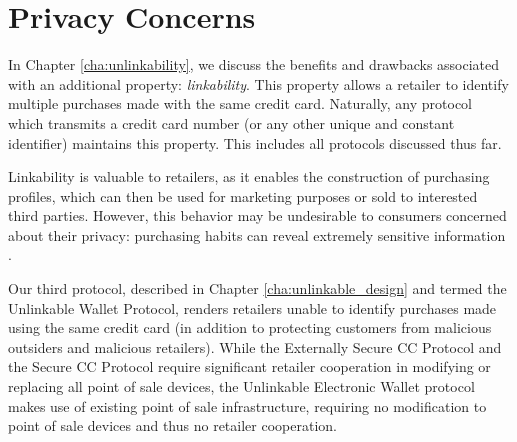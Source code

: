 \section{Privacy Concerns}
\label{sec:intro-privacy}

In Chapter \ref{cha:unlinkability}, we discuss the benefits and drawbacks associated with an additional property: \emph{linkability}.
This property allows a retailer to identify multiple purchases made with the same credit card.
Naturally, any protocol which transmits a credit card number (or any other unique and constant identifier) maintains this property.
This includes all protocols discussed thus far.

Linkability is valuable to retailers, as it enables the construction of purchasing profiles,
    which can then be used for marketing purposes or sold to interested third parties.
However, this behavior may be undesirable to consumers concerned about their privacy:
    purchasing habits can reveal extremely sensitive information \cite{targetpregnant}.

Our third protocol, described in Chapter \ref{cha:unlinkable_design} and termed the Unlinkable Wallet Protocol,
    renders retailers unable to identify purchases made using the same credit card (in addition to protecting customers from malicious outsiders and malicious retailers).
While the Externally Secure CC Protocol and the Secure CC Protocol require significant retailer cooperation in modifying or replacing all point of sale devices,
    the Unlinkable Electronic Wallet protocol makes use of existing point of sale infrastructure,
    requiring no modification to point of sale devices and thus no retailer cooperation.
